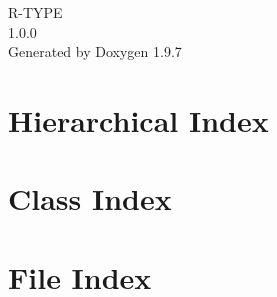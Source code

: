 \documentclass[twoside]{book}
\newcommand{\+}{\discretionary{\mbox{\scriptsize$\hookleftarrow$}}{}{}}
\newcommand{\clearemptydoublepage}{%
    \newpage{\pagestyle{empty}\cleardoublepage}%
  }
\begin{document}
  \raggedbottom
    \hypersetup{pageanchor=false,
                bookmarksnumbered=true,
                pdfencoding=unicode
               }
  \begin{titlepage}
  \vspace*{7cm}
  \begin{center}%
  {\Large R-\/\+TYPE}\\
  [1ex]\large 1.\+0.\+0 \\
  \vspace*{1cm}
  {\large Generated by Doxygen 1.9.7}\\
  \end{center}
  \end{titlepage}
  \clearemptydoublepage
  \tableofcontents
  \clearemptydoublepage
  \hypersetup{pageanchor=true}
\chapter{Hierarchical Index}

\chapter{Class Index}

\chapter{File Index}

\end{document}
